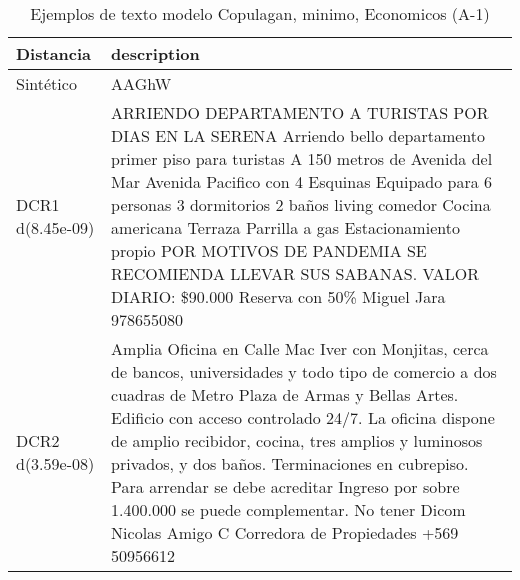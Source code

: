 \begin{table}[H]
\centering
\fontsize{10}{14}\selectfont
\caption{Ejemplos de texto modelo Copulagan, minimo, Economicos (A-1)}
\label{table-example-economicos-a-1-copulagan-min-text}
\begin{tabular}{|l|m{35em}|}
\hline
\rowcolor[gray]{0.8}
Distancia & description \\
\hline Sintético & AAGhW \\
\hline DCR1 d(8.45e-09) & ARRIENDO DEPARTAMENTO A TURISTAS POR DIAS EN LA SERENA Arriendo bello departamento primer piso para turistas A 150 metros de Avenida del Mar Avenida Pacifico con 4 Esquinas Equipado para 6 personas 3 dormitorios 2 ba\~nos  living comedor  Cocina americana Terraza  Parrilla a gas Estacionamiento propio POR MOTIVOS DE PANDEMIA SE RECOMIENDA LLEVAR SUS SABANAS. VALOR DIARIO: \$90.000 Reserva con 50\% Miguel Jara 978655080 \\
\hline DCR2 d(3.59e-08) & Amplia Oficina en Calle Mac Iver con Monjitas, cerca de bancos, universidades y todo tipo de comercio a dos cuadras de Metro Plaza de Armas y Bellas Artes. Edificio con acceso controlado 24/7. La oficina dispone de amplio recibidor, cocina, tres amplios y luminosos privados, y dos ba\~nos. Terminaciones en cubrepiso.  Para arrendar se debe acreditar Ingreso por sobre 1.400.000 se puede complementar. No tener Dicom  Nicolas Amigo C Corredora de Propiedades +569 50956612 \\
\hline
\end{tabular}
\end{table}
